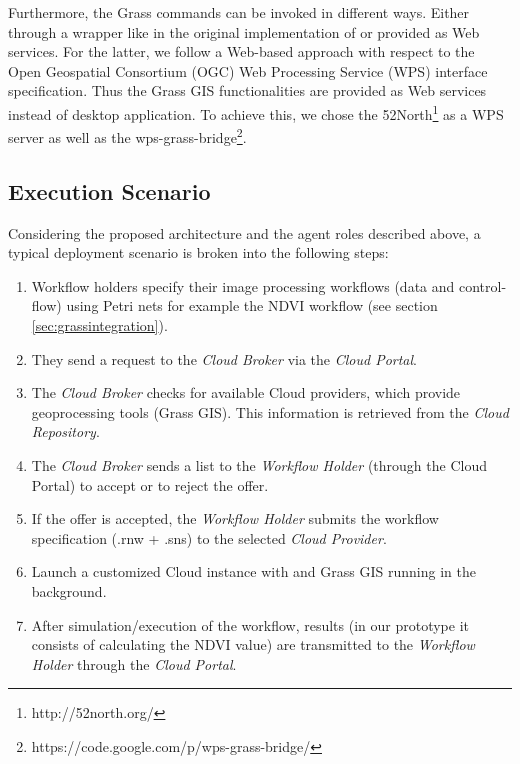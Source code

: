 %
Furthermore, the Grass commands can be invoked in different ways. 
%
Either through a wrapper like in the original implementation of \RenewGrass{} or provided as Web services.
%
For the latter, we follow a Web-based approach with respect to the Open Geospatial Consortium (OGC) Web Processing Service (WPS) interface specification. 
%
Thus the Grass GIS functionalities are provided as Web services instead of desktop application.
%
To achieve this, we chose the 52North\footnote{http://52north.org/} as a WPS server as well as the wps-grass-bridge\footnote{https://code.google.com/p/wps-grass-bridge/}.

%
\subsection{Execution Scenario}

Considering the proposed architecture and the agent roles described above, a typical deployment scenario is broken into the following steps: 
%
\begin{enumerate}
 \item 
Workflow holders specify their image processing workflows (data and control-flow) using Petri nets for example the NDVI workflow (see section \ref{sec:grassintegration}).
\item 
They send a request to the \textit{Cloud Broker} via the \textit{Cloud Portal}.  
\item
The \textit{Cloud Broker} checks for available Cloud providers, which provide geoprocessing tools (Grass GIS).
%
This information is retrieved from the \textit{Cloud Repository}.
%
\item
The \textit{Cloud Broker} sends a list to the \textit{Workflow Holder} (through the Cloud Portal) to accept or to reject the offer.
\item
If the offer is accepted, the \textit{Workflow Holder} submits the workflow specification (.rnw + .sns) to the selected \textit{Cloud Provider}.
\item
Launch a customized Cloud instance with \Renew{} and Grass GIS running in the background.
\item 
After simulation/execution of the workflow, results (in our prototype it consists of calculating the NDVI value) are transmitted to the \textit{Workflow Holder} through the \textit{Cloud Portal}.
\end{enumerate}

